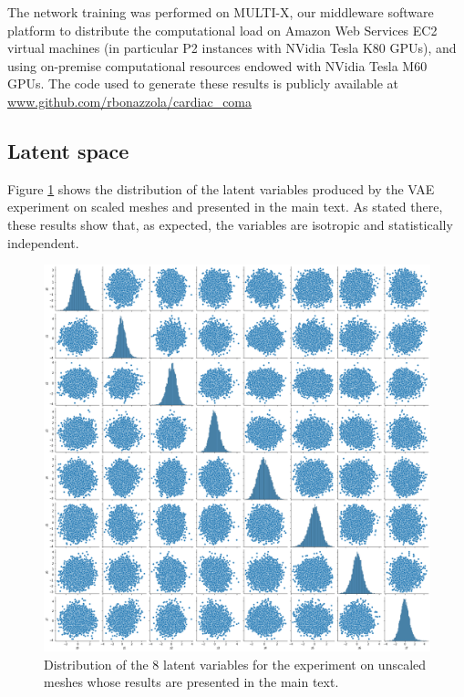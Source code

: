\documentclass[fleqn,10pt]{wlscirep}
\begin{document}
The network training was performed on MULTI-X, our middleware software platform to distribute the computational load on Amazon Web Services EC2 virtual machines (in particular P2 instances with NVidia Tesla K80 GPUs), and using on-premise computational resources endowed with NVidia Tesla M60 GPUs. The code used to generate these results is publicly available at \url{www.github.com/rbonazzola/cardiac\_coma} %

\subsection{Latent space}

Figure \ref{fig:z_distribution} shows the distribution of the latent variables produced by the VAE experiment on scaled meshes and presented in the main text. As stated there, these results show that, as expected, the variables are isotropic and statistically independent.

\begin{figure}
 \centering
 \includegraphics[width=\textwidth]{figs/supplementary/z_distribution.png}
 \caption{Distribution of the 8 latent variables for the experiment on unscaled meshes whose results are presented in the main text.}
 \label{fig:z_distribution}
\end{figure}
\end{document}
